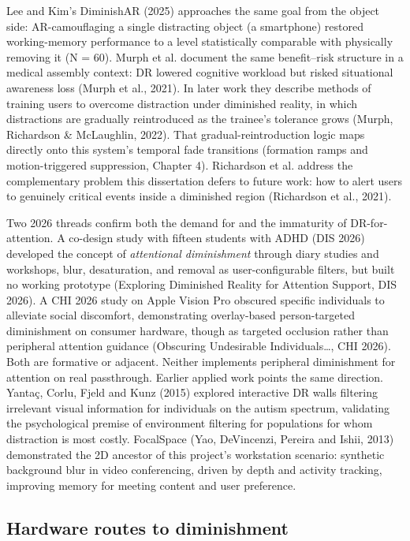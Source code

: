 Lee and Kim's DiminishAR (2025) approaches the same goal from the object side: AR-camouflaging a
single distracting object (a smartphone) restored working-memory performance to a level statistically
comparable with physically removing it (N = 60). Murph et al. document the same benefit–risk
structure in a medical assembly context: DR lowered cognitive workload but risked situational
awareness loss (Murph et al., 2021). In later work they describe methods of training users to
overcome distraction under diminished reality, in which distractions are gradually reintroduced as
the trainee's tolerance grows (Murph, Richardson \& McLaughlin, 2022). That gradual-reintroduction
logic maps directly onto this system's temporal fade transitions (formation ramps and
motion-triggered suppression, Chapter 4). Richardson et al. address the complementary problem this
dissertation defers to future work: how to alert users to genuinely critical events inside a
diminished region (Richardson et al., 2021).

Two 2026 threads confirm both the demand for and the immaturity of DR-for-attention. A co-design
study with fifteen students with ADHD (DIS 2026) developed the concept of \textit{attentional diminishment}
through diary studies and workshops, blur, desaturation, and removal as user-configurable filters,
but built no working prototype (Exploring Diminished Reality for Attention Support, DIS 2026). A CHI
2026 study on Apple Vision Pro obscured specific individuals to alleviate social discomfort,
demonstrating overlay-based person-targeted diminishment on consumer hardware, though as targeted
occlusion rather than peripheral attention guidance (Obscuring Undesirable Individuals…, CHI 2026).
Both are formative or adjacent. Neither implements peripheral diminishment for attention on real
passthrough. Earlier applied work points the same direction. Yantaç, Corlu, Fjeld and Kunz (2015)
explored interactive DR walls filtering irrelevant visual information for individuals on the autism
spectrum, validating the psychological premise of environment filtering for populations for whom
distraction is most costly. FocalSpace (Yao, DeVincenzi, Pereira and Ishii, 2013) demonstrated the 2D
ancestor of this project's workstation scenario: synthetic background blur in video conferencing,
driven by depth and activity tracking, improving memory for meeting content and user preference.

\subsection{Hardware routes to diminishment}

